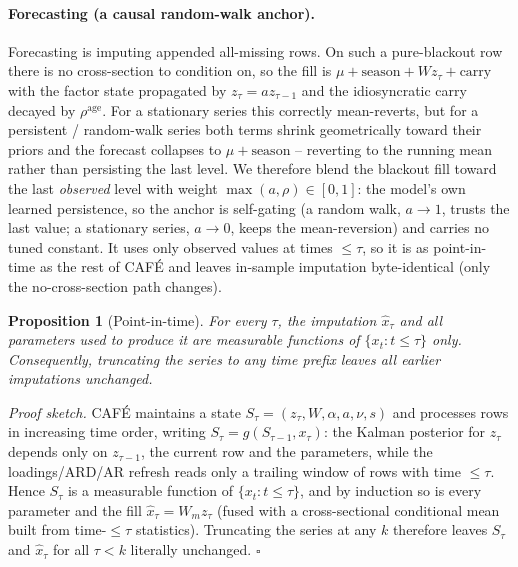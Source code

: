 \documentclass[10pt,twocolumn]{article}
\newcommand{\cafe}{CAF\'E}
\newtheorem{proposition}{Proposition}
\begin{document}
\paragraph{Forecasting (a causal random-walk anchor).} Forecasting is imputing
appended all-missing rows. On such a pure-blackout row there is no cross-section to
condition on, so the fill is $\mu+\text{season}+Wz_\tau+\text{carry}$ with the factor
state propagated by $z_\tau=a z_{\tau-1}$ and the idiosyncratic carry decayed by
$\rho^{\text{age}}$. For a stationary series this correctly mean-reverts, but for a
persistent / random-walk series both terms shrink geometrically toward their priors and
the forecast collapses to $\mu+\text{season}$ -- reverting to the running mean rather than
persisting the last level. We therefore blend the blackout fill toward the last
\emph{observed} level with weight $\max(a,\rho)\in[0,1]$: the model's own learned
persistence, so the anchor is self-gating (a random walk, $a\!\to\!1$, trusts the last
value; a stationary series, $a\!\to\!0$, keeps the mean-reversion) and carries no tuned
constant. It uses only observed values at times $\le\tau$, so it is as point-in-time as
the rest of \cafe{} and leaves in-sample imputation byte-identical (only the
no-cross-section path changes).

\begin{proposition}[Point-in-time]\label{prop:causal}
For every $\tau$, the imputation $\hat x_{\tau}$ and all parameters used to
produce it are measurable functions of $\{x_{t}: t\le\tau\}$ only. Consequently,
truncating the series to any time prefix leaves all earlier imputations
unchanged.
\end{proposition}
\noindent\emph{Proof sketch.} \cafe{} maintains a state
$S_\tau=(z_\tau,W,\alpha,a,\nu,s)$ and processes rows in increasing time order,
writing $S_\tau=g(S_{\tau-1},x_\tau)$: the Kalman posterior for $z_\tau$ depends
only on $z_{\tau-1}$, the current row and the parameters, while the
loadings/ARD/AR refresh reads only a trailing window of rows with time
$\le\tau$. Hence $S_\tau$ is a measurable function of $\{x_t:t\le\tau\}$, and by
induction so is every parameter and the fill $\hat x_\tau=W_{\!m}z_\tau$ (fused
with a cross-sectional conditional mean built from time-$\le\tau$ statistics).
Truncating the series at any $k$ therefore leaves $S_\tau$ and $\hat x_\tau$ for
all $\tau<k$ literally unchanged. $\square$
\end{document}
